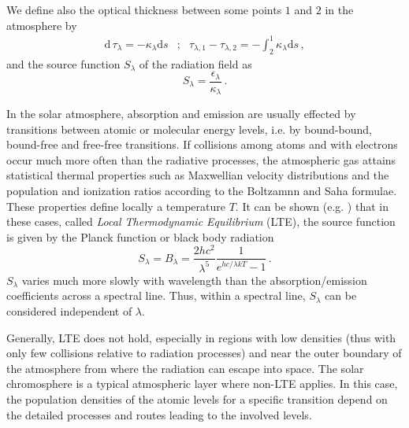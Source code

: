  
 We define also the optical thickness between some points $1$ and $2$ in the atmosphere by
\begin{eqnarray}
\mathrm{d}\,\tau_{\lambda}= -\kappa_{\lambda} \mathrm{d}s &;& \tau_{\lambda,{1}}-\tau_{\lambda,{2}}=-\int_{2}^{1}\kappa_{\lambda}\mathrm{d}s \, ,
\end{eqnarray}
and the source function $S_{\lambda}$ of the radiation field as
\begin{equation}
S_{\lambda}= \frac{ \epsilon_{\lambda}}{\kappa_{\lambda}}\, .
\end{equation}
 
In the solar atmosphere, absorption and emission are usually effected by transitions between atomic or molecular energy levels, i.e. by bound-bound, bound-free and free-free transitions. If collisions among atoms and with electrons occur much more often than the radiative processes, the atmospheric gas attains statistical thermal properties such as Maxwellian velocity distributions and the population and ionization ratios according to the Boltzamnn and Saha formulae. These properties define locally a temperature $T$. It can be shown (e.g. \citealt{Chandrasekhar:1960lr})
that in these cases, called \emph{Local Thermodynamic Equilibrium} (LTE), the source function is given by the Planck function or black body radiation
\begin{equation}
S_{\lambda}=B_{\lambda}=\frac{2hc^{2}}{\lambda^{5}}\frac{1}{e^{hc / \lambda k T}-1}\, .
\end{equation}
$S_{\lambda}$ varies much more slowly with wavelength than the absorption/emission coefficients across a spectral line. Thus, within a spectral line, $S_{\lambda}$ can be considered independent of $\lambda$.

Generally, LTE does not hold, especially in regions with low densities (thus with only few collisions relative to radiation processes) and near the outer boundary of the atmosphere from where the radiation can escape into space. The solar chromosphere is a typical atmospheric layer where non-LTE applies. In this case, the population densities of the atomic levels for a specific transition depend on the detailed processes and routes leading to the involved levels.

